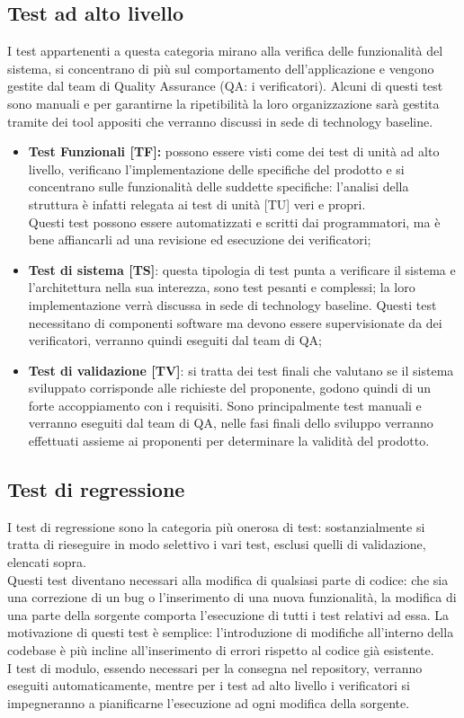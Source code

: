 \documentclass[PianoDiProgetto.tex]{subfiles}
\begin{document}
\subsection{Test ad alto livello}
I test appartenenti a questa categoria mirano alla verifica delle funzionalità del sistema, si concentrano di più sul comportamento dell'applicazione e vengono gestite dal team di Quality Assurance (QA: i verificatori).
Alcuni di questi test sono manuali e per garantirne la ripetibilità la loro organizzazione sarà gestita tramite dei tool appositi che verranno discussi in sede di technology baseline.
\begin{itemize}
	\item \textbf{Test Funzionali [TF]:} possono essere visti come dei test di unità ad alto livello, verificano l'implementazione delle specifiche del prodotto e si concentrano sulle funzionalità delle suddette specifiche: l'analisi della struttura è infatti relegata ai test di unità [TU] veri e propri. \\
	Questi test possono essere automatizzati e scritti dai programmatori, ma è bene affiancarli ad una revisione ed esecuzione dei verificatori;
	\item \textbf{Test di sistema [TS]}: questa tipologia di test punta a verificare il sistema e l'architettura nella sua interezza, sono test pesanti e complessi; la loro implementazione verrà discussa in sede di technology baseline. 
	Questi test necessitano di componenti software ma devono essere supervisionate da dei verificatori, verranno quindi eseguiti dal team di QA;
	\item \textbf{Test di validazione [TV]}: si tratta dei test finali che valutano se il sistema sviluppato corrisponde alle richieste del proponente, godono quindi di un forte accoppiamento con i requisiti. Sono principalmente test manuali e verranno eseguiti dal team di QA, nelle fasi finali dello sviluppo verranno effettuati assieme ai proponenti per determinare la validità del prodotto.
\end{itemize}

\subsection{Test di regressione}
I test di regressione sono la categoria più onerosa di test: sostanzialmente si tratta di rieseguire in modo selettivo i vari test, esclusi quelli di validazione, elencati sopra.\\
Questi test diventano necessari alla modifica di qualsiasi parte di codice: che sia una correzione di un bug o l'inserimento di una nuova funzionalità, la modifica di una parte della sorgente comporta l'esecuzione di tutti i test relativi ad essa. La motivazione di questi test è semplice: l'introduzione di modifiche all'interno della codebase è più incline all'inserimento di errori rispetto al codice già esistente.\\
I test di modulo, essendo necessari per la consegna nel repository, verranno eseguiti automaticamente, mentre per i test ad alto livello i verificatori si impegneranno a pianificarne l'esecuzione ad ogni modifica della sorgente.
	
\end{document}
